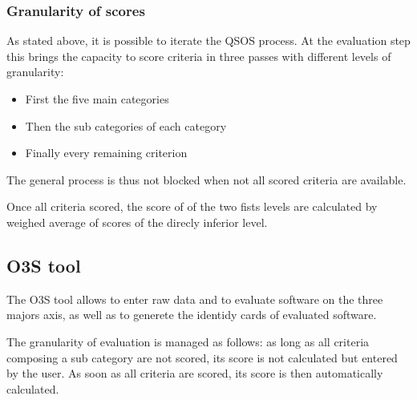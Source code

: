 \subsubsection{Granularity of scores}
As stated above, it is possible to iterate the QSOS process. 
At the evaluation step this brings the capacity to score criteria in 
three passes with different levels of granularity:

\begin{itemize}
\item First the five main categories
\item Then the sub categories of each category
\item Finally every remaining criterion
\end{itemize}


The general process is thus not blocked when not all scored criteria are available.


Once all criteria scored, the score of of the two fists levels are calculated by weighed average of scores of the direcly inferior level.

\subsection{O3S tool}
The O3S tool allows to enter raw data and to evaluate software on the three majors axis, 
as well as to generete the identidy cards of evaluated software.


The granularity of evaluation is managed as follows: as long as all
criteria composing a sub category are not scored, its score is not 
calculated but entered by the user. As soon as all criteria are scored, 
its score is then automatically calculated.